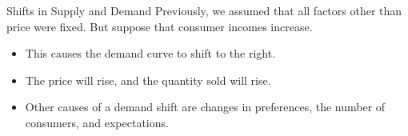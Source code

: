 \documentclass[12pt,t]{beamer}
\begin{document}
\begin{frame}{Shifts in Supply and Demand}
  Previously, we assumed that all factors other than price were fixed. But suppose that consumer incomes increase.

  \bigskip
  \pause
  \begin{itemize}
    \item This causes the demand curve to shift to the right.

    \pause
    \item The price will rise, and the quantity sold will rise.

    \item Other causes of a demand shift are changes in preferences, the number of consumers, and expectations.
  \end{itemize}
\end{frame}
\end{document}
